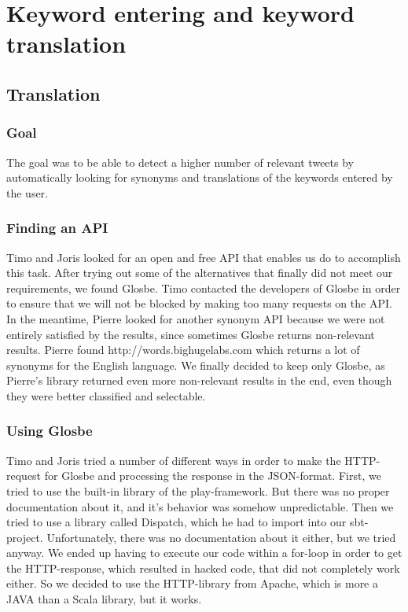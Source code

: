 \section{Keyword entering and keyword translation }
\subsection{Translation}
\label{sec:translation}
\subsubsection{Goal}
The goal was to be able to detect a higher number of relevant tweets by automatically looking for synonyms and translations of the keywords entered by the user.

\subsubsection{Finding an API}

Timo and Joris looked for an open and free API that enables us do to accomplish this task. After trying out some of the alternatives that finally did not meet our requirements, we found Glosbe. Timo contacted the developers of Glosbe in order to ensure that we will not be blocked by making too many requests on the API. In the meantime, Pierre looked for another synonym API because we were not entirely satisfied by the results, since sometimes Glosbe returns non-relevant results. Pierre found http://words.bighugelabs.com which returns a lot of synonyms for the English language. We finally decided to keep only Glosbe, as Pierre's library returned even more non-relevant results in the end, even though they were better classified and selectable.

\subsubsection{Using Glosbe}

Timo and Joris tried a number of different ways in order to make the HTTP-request for Glosbe and processing the response in the JSON-format. First, we tried to use the built-in library of the play-framework. But there was no proper documentation about it, and it's behavior was somehow unpredictable. Then we tried to use a library called Dispatch, which he had to import into our sbt-project. Unfortunately, there was no documentation about it either, but we tried anyway. We ended up having to execute our code within a for-loop in order to get the HTTP-response, which resulted in hacked code, that did not completely work either. So we decided to use the HTTP-library from Apache, which is more a JAVA than a Scala library, but it works.

